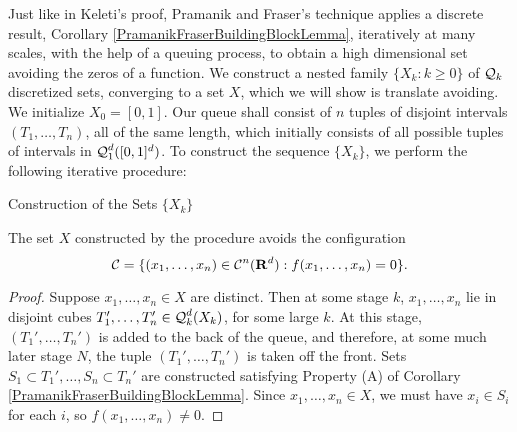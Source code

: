 Just like in Keleti's proof, Pramanik and Fraser's technique applies a discrete result, Corollary \ref{PramanikFraserBuildingBlockLemma}, iteratively at many scales, with the help of a queuing process, to obtain a high dimensional set avoiding the zeros of a function. We construct a nested family $\{ X_k : k \geq 0 \}$ of $\operatorname{\mathcal{Q}}_k$ discretized sets, converging to a set $X$, which we will show is translate avoiding. We initialize $X_0 = [0,1]$. Our queue shall consist of $n$ tuples of disjoint intervals $(T_1, \dots, T_n)$, all of the same length, which initially consists of all possible tuples of intervals in $\operatorname{\mathcal{Q}}_1^d([0,1]^d)$. To construct the sequence $\{ X_k \}$, we perform the following iterative procedure:
%
\begin{algorithm}[H]
    \begin{algorithmic}
        \caption{Construction of the Sets $\{ X_k \}$}
        \MRepeat
        \EndRepeat   
    \end{algorithmic}
\end{algorithm}

\begin{lemma}
    The set $X$ constructed by the procedure avoids the configuration
    \[ \operatorname{\mathcal{C}} = \{ (x_1, \dots, x_n) \in \operatorname{\mathcal{C}}^n(\operatorname{\mathbf{R}}^d) : f(x_1, \dots, x_n) = 0 \}. \]
\end{lemma}
\begin{proof}
    Suppose $x_1, \dots, x_n \in X$ are distinct. Then at some stage $k$, $x_1, \dots, x_n$ lie in disjoint cubes $T_1', \dots, T_n' \in \operatorname{\mathcal{Q}}_k^d(X_k)$, for some large $k$. At this stage, $(T_1', \dots, T_n')$ is added to the back of the queue, and therefore, at some much later stage $N$, the tuple $(T_1', \dots, T_n')$ is taken off the front. Sets $S_1 \subset T_1', \dots, S_n \subset T_n'$ are constructed satisfying Property (A) of Corollary \ref{PramanikFraserBuildingBlockLemma}. Since $x_1, \dots, x_n \in X$, we must have $x_i \in S_i$ for each $i$, so $f(x_1, \dots, x_n) \neq 0$.
\end{proof}

